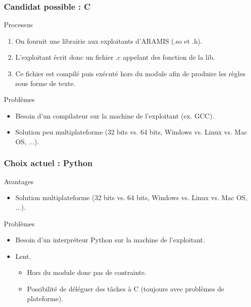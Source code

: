 \documentclass{beamer}
\newcommand{\cmark}{{\color{green!60!black}\ding{51}}}%
\newcommand{\xmark}{{\color{red}\ding{55}}}%
\newcommand{\ARAMIS}{ARAMIS}
\begin{document}
\begin{frame}
    \frametitle{Candidat possible : C}
    
    \begin{block}{Processus}
        \begin{enumerate}
            \item On fournit une librairie aux exploitants d'\ARAMIS{} (.so et .h).
            \item L'exploitant écrit donc un fichier .c appelant des fonction de la lib.
            \item Ce fichier est compilé puis exécuté hors du module afin de produire les règles sous forme de texte.
        \end{enumerate}
    \end{block}
    \vfill
    \begin{block}{Problèmes}
        \begin{itemize}
            \item[\xmark] Besoin d'un compilateur sur la machine de l'exploitant (ex. GCC).
            \item[\xmark] Solution peu multiplateforme (32 bits vs. 64 bits, Windows vs. Linux vs. Mac OS, ...).
        \end{itemize}
    \end{block}
\end{frame}

\begin{frame}
    \frametitle{Choix actuel : Python}
    
    \begin{block}{Avantages}
        \begin{itemize}
            \item[\cmark] Solution multiplateforme (32 bits vs. 64 bits, Windows vs. Linux vs. Mac OS, ...).
        \end{itemize}
    \end{block}
    \vfill
    \begin{block}{Problèmes}
        \begin{itemize}
            \item[\xmark] Besoin d'un interpréteur Python sur la machine de l'exploitant.
            \item[\xmark] Lent.
            \begin{itemize}
                \item[\cmark] Hors du module donc pas de contrainte.
                \item[\cmark] Possibilité de déléguer des tâches à C (toujours avec problèmes de plateforme).
            \end{itemize}
        \end{itemize}
    \end{block}
\end{frame}
\end{document}
